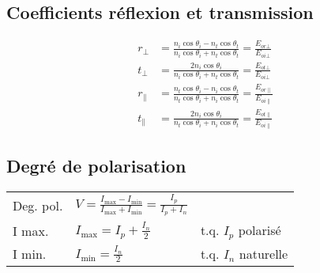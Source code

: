 \subsection{Coefficients réflexion et transmission}
\begin{align*}
    r_{\bot} &= \frac{n_i\cos{\theta_i}-n_t\cos{\theta_t}}{n_i\cos{\theta_i}+n_t\cos{\theta_t}} = \frac{E_{or\bot}}{E_{oi\bot}}\\
    t_{\bot} &= \frac{2n_i\cos{\theta_i}}{n_i\cos{\theta_i}+n_t\cos{\theta_t}} = \frac{E_{ot\bot}}{E_{oi\bot}}\\
    r_{\parallel} &= \frac{n_t\cos{\theta_i}-n_i\cos{\theta_t}}{n_t\cos{\theta_i}+n_i\cos{\theta_t}} = \frac{E_{or\parallel}}{E_{oi\parallel}}\\
    t_{\parallel} &= \frac{2n_i\cos{\theta_i}}{n_t\cos{\theta_i}+n_i\cos{\theta_t}} = \frac{E_{ot\parallel}}{E_{oi\parallel}}
\end{align*}

\subsection{Degré de polarisation}
\begin{tabular}{lll}
    Deg. pol. & \(V=\frac{I_{\mathrm{max}}-I_{\mathrm{min}}}{I_{\mathrm{max}}+I_{\mathrm{min}}}=\frac{I_p}{I_p+I_n}\) & \\[8pt]
    I max. & \( I_{\mathrm{max}}=I_p+\frac{I_n}{2}\)  & t.q. $I_p$ polarisé\\
    I min. & \( I_{\mathrm{min}}=\frac{I_n}{2}\)  & t.q. $I_n$ naturelle
\end{tabular}

